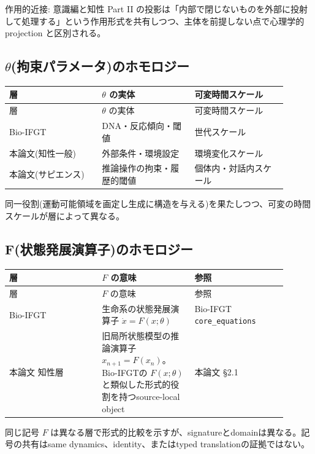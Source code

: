 作用的近接: 意識編と知性 Part II の投影は「内部で閉じないものを外部に投射して処理する」という作用形式を共有しつつ、主体を前提しない点で心理学的 projection と区別される。

\bigskip


\subsection{$\theta$(拘束パラメータ)のホモロジー}


\begin{longtable}{@{}p{0.30\linewidth}p{0.30\linewidth}p{0.30\linewidth}@{}}
\toprule
層 & $\theta$ の実体 & 可変時間スケール \\
\midrule
\endfirsthead
\toprule
層 & $\theta$ の実体 & 可変時間スケール \\
\midrule
\endhead
Bio-IFGT & DNA・反応傾向・閾値 & 世代スケール \\
本論文(知性一般) & 外部条件・環境設定 & 環境変化スケール \\
本論文(サピエンス) & 推論操作の拘束・履歴的閾値 & 個体内・対話内スケール \\
\bottomrule
\end{longtable}


同一役割(運動可能領域を画定し生成に構造を与える)を果たしつつ、可変の時間スケールが層によって異なる。

\bigskip


\subsection{F(状態発展演算子)のホモロジー}


\begin{longtable}{@{}p{0.30\linewidth}p{0.30\linewidth}p{0.30\linewidth}@{}}
\toprule
層 & $F$ の意味 & 参照 \\
\midrule
\endfirsthead
\toprule
層 & $F$ の意味 & 参照 \\
\midrule
\endhead
Bio-IFGT & 生命系の状態発展演算子 $\dot{x} = F(x;\theta)$ & Bio-IFGT \texttt{core\_equations} \\
本論文 知性層 & 旧局所状態模型の推論演算子 $x_{n+1} = F(x_n)$。Bio-IFGTの $F(x;\theta)$ と類似した形式的役割を持つsource-local object & 本論文 \S{}2.1 \\
\bottomrule
\end{longtable}


同じ記号 $F$ は異なる層で形式的比較を示すが、signatureとdomainは異なる。記号の共有はsame dynamics、identity、またはtyped translationの証拠ではない。


